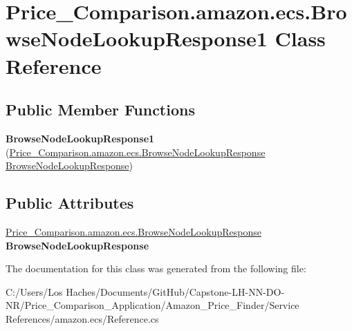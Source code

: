 \hypertarget{class_price___comparison_1_1amazon_1_1ecs_1_1_browse_node_lookup_response1}{\section{Price\-\_\-\-Comparison.\-amazon.\-ecs.\-Browse\-Node\-Lookup\-Response1 Class Reference}
\label{class_price___comparison_1_1amazon_1_1ecs_1_1_browse_node_lookup_response1}
}
\subsection*{Public Member Functions}
\begin{DoxyCompactItemize}
\item 
\hypertarget{class_price___comparison_1_1amazon_1_1ecs_1_1_browse_node_lookup_response1_a4950a30fe3479dadc21d190669bb0fc1}{{\bfseries Browse\-Node\-Lookup\-Response1} (\hyperlink{class_price___comparison_1_1amazon_1_1ecs_1_1_browse_node_lookup_response}{Price\-\_\-\-Comparison.\-amazon.\-ecs.\-Browse\-Node\-Lookup\-Response} \hyperlink{class_price___comparison_1_1amazon_1_1ecs_1_1_browse_node_lookup_response}{Browse\-Node\-Lookup\-Response})}\label{class_price___comparison_1_1amazon_1_1ecs_1_1_browse_node_lookup_response1_a4950a30fe3479dadc21d190669bb0fc1}

\end{DoxyCompactItemize}
\subsection*{Public Attributes}
\begin{DoxyCompactItemize}
\item 
\hypertarget{class_price___comparison_1_1amazon_1_1ecs_1_1_browse_node_lookup_response1_af4893c44b25192f8d42d28fec2037d6b}{\hyperlink{class_price___comparison_1_1amazon_1_1ecs_1_1_browse_node_lookup_response}{Price\-\_\-\-Comparison.\-amazon.\-ecs.\-Browse\-Node\-Lookup\-Response} {\bfseries Browse\-Node\-Lookup\-Response}}\label{class_price___comparison_1_1amazon_1_1ecs_1_1_browse_node_lookup_response1_af4893c44b25192f8d42d28fec2037d6b}

\end{DoxyCompactItemize}


The documentation for this class was generated from the following file\-:\begin{DoxyCompactItemize}
\item 
C\-:/\-Users/\-Los Haches/\-Documents/\-Git\-Hub/\-Capstone-\/\-L\-H-\/\-N\-N-\/\-D\-O-\/\-N\-R/\-Price\-\_\-\-Comparison\-\_\-\-Application/\-Amazon\-\_\-\-Price\-\_\-\-Finder/\-Service References/amazon.\-ecs/Reference.\-cs\end{DoxyCompactItemize}
